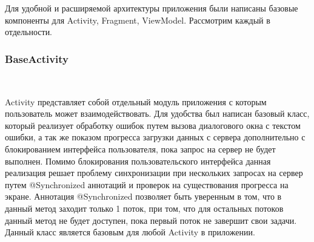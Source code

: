 Для удобной и расширяемой архитектуры приложения были написаны базовые компоненты для Activity, Fragment, ViewModel. Рассмотрим каждый в отдельности.

\subsubsection{BaseActivity}~\par
Activity представляет собой отдельный модуль приложения с которым пользователь может взаимодействовать. Для удобства был написан базовый класс, который реализует обработку ошибок путем вызова диалогового окна с текстом ошибки, а так же показом прогресса загрузки данных с сервера дополнительно с блокированием интерфейса пользователя, пока запрос на сервер не будет выполнен. Помимо блокирования пользовательского интерфейса данная реализация решает проблему синхронизации при нескольких запросах на сервер путем @Synchronized аннотаций и проверок на существования прогресса на экране. Аннотация @Synchronized позволяет быть уверенным в том, что в данный метод заходит только 1 поток, при том, что для остальных потоков данный метод не будет доступен, пока первый поток не завершит свои задачи. Данный класс является базовым для любой Activity в приложении.

